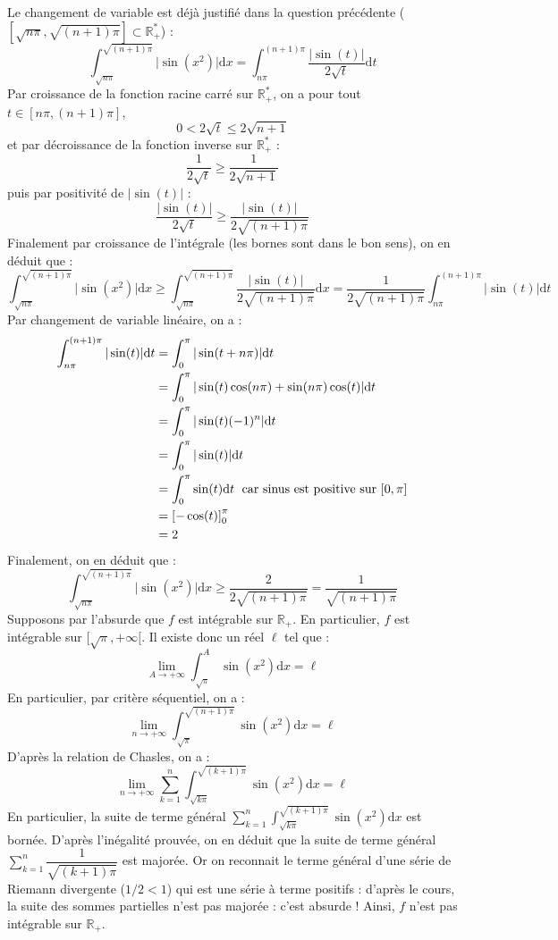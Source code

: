 \documentclass[a4paper,twoside,french,10pt]{VcCours}
\newcommand{\dx}{\text{d}x}
\newcommand{\dt}{\text{d}t}
\begin{document}
\begin{enumerate}
Le changement de variable est déjà justifié dans la question précédente ($[\sqrt{n \pi},\sqrt{(n+1)\pi}]\subset \mathbb{R}_+^*$) :
$$ \int_{\sqrt{n \pi}}^{\sqrt{(n+1)\pi}} \vert \sin(x^2) \vert \dx = \int_{n \pi}^{(n+1)\pi} \dfrac{\vert \sin(t) \vert}{2 \sqrt{t}} \dt$$
Par croissance de la fonction racine carré sur $\mathbb{R}_+^{*}$, on a pour tout $t \in [n \pi,(n+1)\pi]$, 
$$ 0<2 \sqrt{t} \leq 2 \sqrt{n+1}$$
et par décroissance de la fonction inverse sur $\mathbb{R}_+^{*}$ :
$$ \dfrac{1}{2\sqrt{t}} \geq \dfrac{1}{2\sqrt{n+1}}$$
puis par positivité de $\vert \sin(t) \vert$ :
$$ \dfrac{\vert \sin(t) \vert}{2 \sqrt{t}} \geq \dfrac{\vert \sin(t) \vert}{2 \sqrt{(n+1)\pi}}$$
Finalement par croissance de l'intégrale (les bornes sont dans le bon sens), on en déduit que :
$$ \int_{\sqrt{n \pi}}^{\sqrt{(n+1)\pi}} \vert \sin(x^2) \vert \dx \geq \int_{\sqrt{n \pi}}^{\sqrt{(n+1)\pi}} \dfrac{\vert \sin(t) \vert}{2 \sqrt{(n+1)\pi}} \dx = \dfrac{1}{2 \sqrt{(n+1)\pi}} \int_{n\pi}^{(n+1) \pi} \vert \sin(t) \vert \dt$$
Par changement de variable linéaire, on a : 
\begin{align*}
 \int_{n\pi}^{(n+1) \pi} \vert \sin(t) \vert \dt & =  \int_{0}^{\pi} \vert \sin(t+n \pi) \vert \dt\\
 & = \int_{0}^{\pi} \vert \sin(t) \cos(n \pi)+ \sin(n\pi)\cos(t) \vert \dt \\
 & =  \int_{0}^{\pi} \vert \sin(t) (-1)^n  \vert \dt \\
 & = \int_{0}^{\pi} \vert \sin(t)  \vert \dt \\
 & = \int_{0}^{\pi}  \sin(t)   \dt  \; \hbox{ car sinus est positive sur } [0,\pi] \\
 & = \left[- \cos(t) \right]_0^{\pi} \\
 & = 2
\end{align*}
Finalement, on en déduit que :
$$ \int_{\sqrt{n \pi}}^{\sqrt{(n+1)\pi}} \vert \sin(x^2) \vert \dx \geq \dfrac{2}{2 \sqrt{(n+1)\pi}} = \dfrac{1}{\sqrt{(n+1)\pi}}$$
Supposons par l'absurde que $f$ est intégrable sur $\mathbb{R}_+$. En particulier, $f$ est intégrable sur $[\sqrt{\pi}, + \infty[$. Il existe donc un réel $\ell$ tel que :
 $$ \lim_{A \rightarrow + \infty} \int_{\sqrt{\pi}}^A \sin(x^2) \dx = \ell$$
 En particulier, par critère séquentiel, on a :
 $$ \lim_{n \rightarrow + \infty} \int_{\sqrt{\pi}}^{\sqrt{(n+1)\pi}} \sin(x^2) \dx = \ell$$
 D'après la relation de Chasles, on a :
 $$ \lim_{n \rightarrow + \infty} \sum_{k=1}^n \int_{\sqrt{k\pi}}^{\sqrt{(k+1)\pi}} \sin(x^2) \dx = \ell$$
 En particulier, la suite de terme général $\sum_{k=1}^n \int_{\sqrt{k\pi}}^{\sqrt{(k+1)\pi}} \sin(x^2) \dx$ est bornée. D'après l'inégalité prouvée, on en déduit que la suite de terme général $\sum_{k=1}^n \dfrac{1}{\sqrt{(k+1)\pi}}$ est majorée. Or on reconnait le terme général d'une série de Riemann divergente ($1/2<1$) qui est une série à terme positifs : d'après le cours, la suite des sommes partielles n'est pas majorée : c'est absurde ! Ainsi, $f$ n'est pas intégrable sur $\mathbb{R}_+$.
  \end{enumerate}
\end{document}
